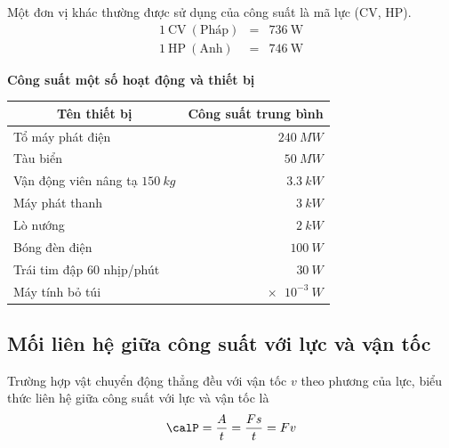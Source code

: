 Một đơn vị khác thường được sử dụng của công suất là mã lực (CV, HP).
\begin{eqnarray*}
	1\ \text{CV}\ (\text{Pháp}) &=& 736\ \text{W}\\
	1\ \text{HP}\ (\text{Anh}) &=& 746\ \text{W}		
\end{eqnarray*}
\begin{center}
\textbf{Công suất một số hoạt động và thiết bị }
\end{center}
\begin{center}
	
	\begin{tabular}{|l|r|}
		\hline
		\multicolumn{1}{|c|}{\textbf{Tên thiết bị}} & \multicolumn{1}{c|}{\textbf{Công suất trung bình}} \\ \hline
		Tổ máy phát điện                            & $\SI{240}{MW}$                                     \\ \hline
		Tàu biển                                    & $\SI{50}{MW}$                                      \\ \hline
		Vận động viên nâng tạ $\SI{150}{kg}$        & $\SI{3.3}{kW}$                                     \\ \hline
		Máy phát thanh                              & $\SI{3}{kW}$                                       \\ \hline
		Lò nướng                                    & $\SI{2}{kW}$                                       \\ \hline
		Bóng đèn điện                               & $\SI{100}{W}$                                      \\ \hline
		Trái tim đập 60 nhịp/phút                   & $\SI{30}{W}$                                       \\ \hline
		Máy tính bỏ túi                             & $\SI{e-3}{W}$                                    \\ \hline
	\end{tabular}
	
\end{center}
\subsection{Mối liên hệ giữa công suất với lực và vận tốc}
Trường hợp vật chuyển động thẳng đều với vận tốc $v$ theo phương của lực, biểu thức liên hệ giữa công suất với lực và vận tốc là
$$\calP = \dfrac{A}{t} = \dfrac{Fs}{t}= Fv$$

